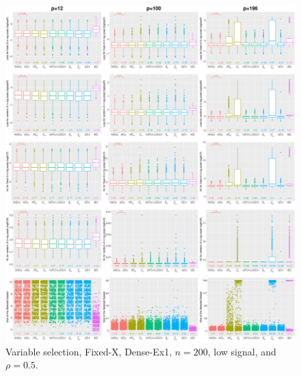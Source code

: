 \begin{figure}[!ht]
\centering
\includegraphics[width=\textwidth]{figures/supplement/fixedx/subset_selection/Dense-Ex1_n200_lsnr_rho05.eps}
\caption{Variable selection, Fixed-X, Dense-Ex1, $n=200$, low signal, and $\rho=0.5$.}
\end{figure}
\clearpage
